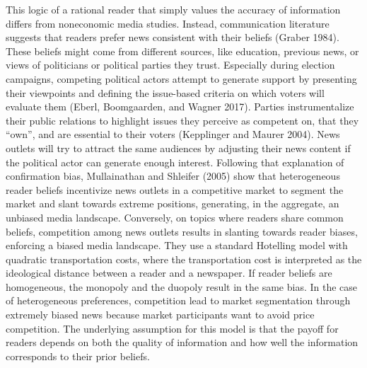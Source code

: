 \documentclass[
  12pt,
]{article}
\begin{document}
This logic of a rational reader that simply values the accuracy of
information differs from noneconomic media studies. Instead,
communication literature suggests that readers prefer news consistent
with their beliefs (Graber 1984). These beliefs might come from
different sources, like education, previous news, or views of
politicians or political parties they trust. Especially during election
campaigns, competing political actors attempt to generate support by
presenting their viewpoints and defining the issue-based criteria on
which voters will evaluate them (Eberl, Boomgaarden, and Wagner 2017).
Parties instrumentalize their public relations to highlight issues they
perceive as competent on, that they ``own'', and are essential to their
voters (Kepplinger and Maurer 2004). News outlets will try to attract
the same audiences by adjusting their news content if the political
actor can generate enough interest. Following that explanation of
confirmation bias, Mullainathan and Shleifer (2005) show that
heterogeneous reader beliefs incentivize news outlets in a competitive
market to segment the market and slant towards extreme positions,
generating, in the aggregate, an unbiased media landscape. Conversely,
on topics where readers share common beliefs, competition among news
outlets results in slanting towards reader biases, enforcing a biased
media landscape. They use a standard Hotelling model with quadratic
transportation costs, where the transportation cost is interpreted as
the ideological distance between a reader and a newspaper. If reader
beliefs are homogeneous, the monopoly and the duopoly result in the same
bias. In the case of heterogeneous preferences, competition lead to
market segmentation through extremely biased news because market
participants want to avoid price competition. The underlying assumption
for this model is that the payoff for readers depends on both the
quality of information and how well the information corresponds to their
prior beliefs.
\end{document}
